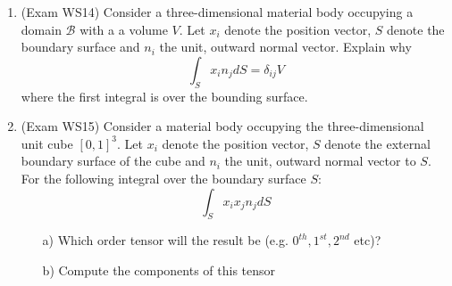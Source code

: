 \documentclass{article}
\newcommand{\ee}{\end{equation}}
\newcommand{\be}{\begin{equation}}
\begin{document}
\begin{enumerate}
\item (Exam WS14) Consider  a three-dimensional material body occupying a domain $\mathcal{B}$ with a  a volume $V$. Let
$x_i$ denote the position vector,  $S$ denote the boundary surface and $n_i$ the unit,  outward normal vector. Explain why
\be
\int_S x_i n_j dS=\delta_{ij} V
\ee
where the first integral is over the bounding surface.

\item (Exam WS15) Consider a material body occupying the three-dimensional unit cube $[0, 1]^3$.
Let $x_i$ denote the position vector, $S$ denote the external boundary surface of the cube and $n_i$
the unit, outward normal vector to $S$. For the following integral over the boundary surface
$S$:
\be
\int_S x_i x_j n_j dS
\ee
\begin{itemize}
\item[a)] Which order tensor will the result be (e.g. $0^{th}, 1^{st}, 2^{nd}$ etc)?
\item[b)] Compute the components of this tensor
\end{itemize}





\end{enumerate}
\end{document}

